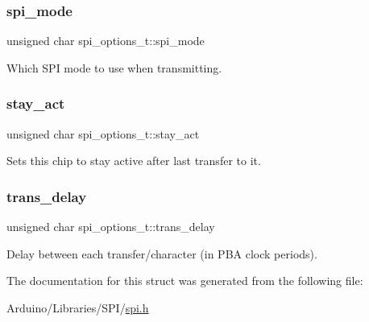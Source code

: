 \subsubsection{\texorpdfstring{spi\+\_\+mode}{spi\_mode}}
{\footnotesize\ttfamily unsigned char spi\+\_\+options\+\_\+t\+::spi\+\_\+mode}



Which S\+PI mode to use when transmitting. 

\mbox{\label{structspi__options__t_a7c76c05bc4b82544aabe1d71e68baef1}} 
\subsubsection{\texorpdfstring{stay\+\_\+act}{stay\_act}}
{\footnotesize\ttfamily unsigned char spi\+\_\+options\+\_\+t\+::stay\+\_\+act}



Sets this chip to stay active after last transfer to it. 

\mbox{\label{structspi__options__t_aee521fc57eda6597539edb8d4dff56eb}} 
\subsubsection{\texorpdfstring{trans\+\_\+delay}{trans\_delay}}
{\footnotesize\ttfamily unsigned char spi\+\_\+options\+\_\+t\+::trans\+\_\+delay}



Delay between each transfer/character (in P\+BA clock periods). 



The documentation for this struct was generated from the following file\+:\begin{DoxyCompactItemize}
\item 
Arduino/\+Libraries/\+S\+P\+I/\hyperlink{spi_8h}{spi.\+h}\end{DoxyCompactItemize}
